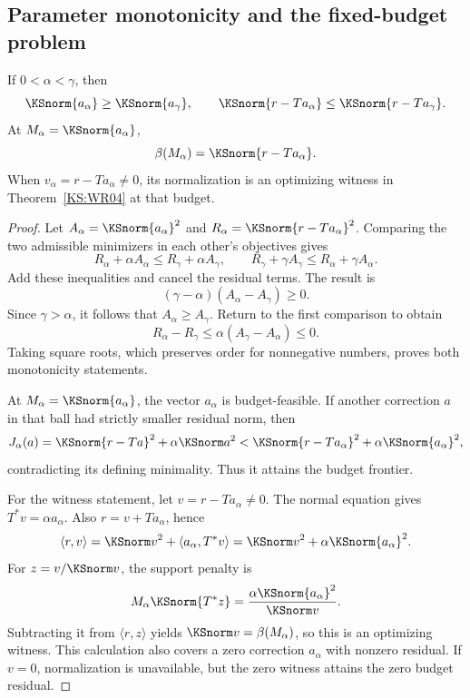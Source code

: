 \subsection{Parameter monotonicity and the fixed-budget problem}
\begin{KSproposition}\label{KS:WR07}
If $0<\alpha<\gamma$, then
\[
 \KSnorm{a_\alpha}\ge\KSnorm{a_\gamma},\qquad
 \KSnorm{r-Ta_\alpha}\le\KSnorm{r-Ta_\gamma}.
\]
At $M_\alpha=\KSnorm{a_\alpha}$,
\[
 \beta(M_\alpha)=\KSnorm{r-Ta_\alpha}.
\]
When $v_\alpha=r-Ta_\alpha\ne0$, its normalization is an optimizing witness in Theorem~\ref{KS:WR04} at that budget.
\end{KSproposition}
\begin{proof}
Let $A_\alpha=\KSnorm{a_\alpha}^2$ and $R_\alpha=\KSnorm{r-Ta_\alpha}^2$. Comparing the two admissible minimizers in each other's objectives gives
\[
 R_\alpha+\alpha A_\alpha\le R_\gamma+\alpha A_\gamma,
 \qquad R_\gamma+\gamma A_\gamma\le R_\alpha+\gamma A_\alpha.
\]
Add these inequalities and cancel the residual terms. The result is
\[
 (\gamma-\alpha)(A_\alpha-A_\gamma)\ge0.
\]
Since $\gamma>\alpha$, it follows that $A_\alpha\ge A_\gamma$. Return to the first comparison to obtain
\[
 R_\alpha-R_\gamma\le\alpha(A_\gamma-A_\alpha)\le0.
\]
Taking square roots, which preserves order for nonnegative numbers, proves both monotonicity statements.

At $M_\alpha=\KSnorm{a_\alpha}$, the vector $a_\alpha$ is budget-feasible. If another correction $a$ in that ball had strictly smaller residual norm, then
\[
 J_\alpha(a)
 =\KSnorm{r-Ta}^2+\alpha\KSnorm a^2
 <\KSnorm{r-Ta_\alpha}^2+\alpha\KSnorm{a_\alpha}^2,
\]
contradicting its defining minimality. Thus it attains the budget frontier.

For the witness statement, let $v=r-Ta_\alpha\ne0$. The normal equation gives $T^*v=\alpha a_\alpha$. Also $r=v+Ta_\alpha$, hence
\[
 \langle r,v\rangle
 =\KSnorm v^2+\langle a_\alpha,T^*v\rangle
 =\KSnorm v^2+\alpha\KSnorm{a_\alpha}^2.
\]
For $z=v/\KSnorm v$, the support penalty is
\[
 M_\alpha\KSnorm{T^*z}
 =\frac{\alpha\KSnorm{a_\alpha}^2}{\KSnorm v}.
\]
Subtracting it from $\langle r,z\rangle$ yields $\KSnorm v=\beta(M_\alpha)$, so this is an optimizing witness. This calculation also covers a zero correction $a_\alpha$ with nonzero residual. If $v=0$, normalization is unavailable, but the zero witness attains the zero budget residual.
\end{proof}


